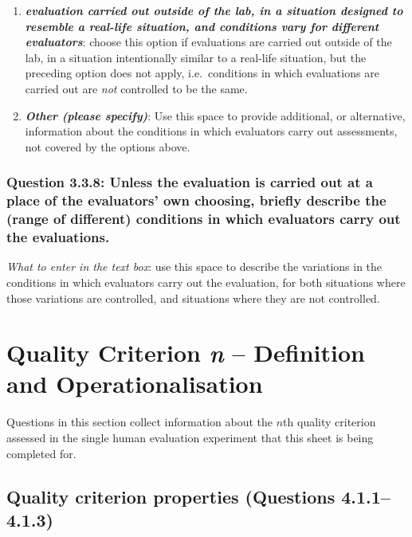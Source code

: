 \documentclass[11pt,a4paper]{article}
\newcommand{\egcvalue}[1]{\textbf{\textit{#1}}}
\begin{document}
\begin{enumerate}[itemsep=0cm,leftmargin=0.5cm,label={\LARGE $\circ$}]
    \item \egcvalue{evaluation carried out outside of the lab, in a situation designed to resemble a real-life situation, and conditions vary for different evaluators}: choose this option if evaluations are carried out outside of the lab, in a situation intentionally similar to a real-life situation, but the preceding option does not apply, i.e.\ conditions in which evaluations are carried out are \textit{not} controlled to be the same. 
    \item \egcvalue{Other (please specify)}: Use this space to provide additional, or alternative, information about the conditions in which evaluators carry out assessments, not covered by the options above.
\end{enumerate}

\vspace{-.3cm}
\subsubsection*{Question 3.3.8:  Unless the evaluation is carried out at a place of the evaluators'  own choosing, briefly describe the (range of different) conditions in which evaluators carry out the evaluations.}

\noindent\textit{What to enter in the text box}: use this space to describe the variations in the conditions in which evaluators carry out the evaluation, for both situations where those variations are controlled, and situations where they are not controlled.

\vspace{-.3cm}

\section{Quality Criterion \textit{n} -- Definition and Operationalisation}
\label{sec:criteria}

Questions in this section collect information about the $n$th quality criterion assessed in the single human evaluation experiment that this sheet is being completed for.


\subsection{Quality criterion properties (Questions 4.1.1--4.1.3)}
\end{document}
